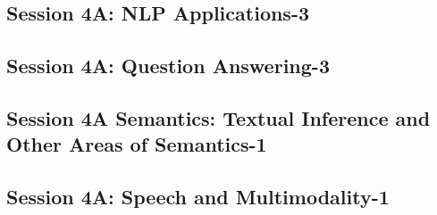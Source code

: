 \subsection{\large Session 4A: NLP Applications-3}
\label{parallel-session-4A-trackD}
\TrackDLoc\hfill\sessionchair{}{}
\clearpage
\subsection{\large Session 4A: Question Answering-3}
\label{parallel-session-4A-trackE}
\TrackELoc\hfill\sessionchair{}{}
\clearpage
\subsection{\large Session 4A Semantics: Textual Inference and Other Areas of Semantics-1}
\label{parallel-session-4A-trackF}
\TrackFLoc\hfill\sessionchair{}{}
\clearpage
\subsection{\large Session 4A: Speech and Multimodality-1}
\label{parallel-session-4A-trackG}
\TrackGLoc\hfill\sessionchair{}{}
\clearpage


